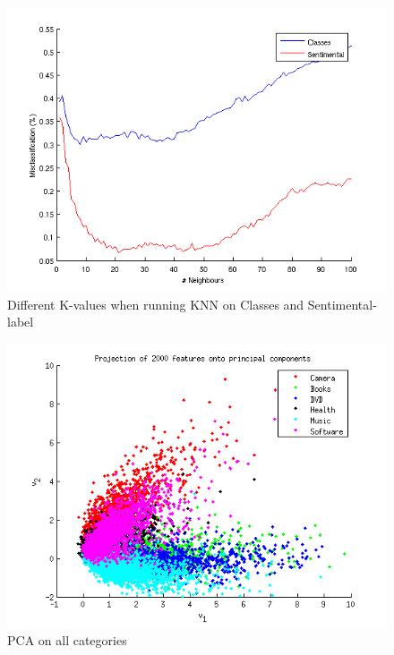 \begin{figure}[H]
\centering
\includegraphics[scale = 0.5]{../Plottar/knn_2000words_testdata100_unigram.png}
\caption{Different K-values when running KNN on Classes and Sentimental-label}
\label{fig:trainingsize}
\end{figure} 


\begin{figure}[H]
\centering
\includegraphics[scale = 0.5]{../Plottar/pca_all.png}
\caption{PCA on all categories}
\label{fig:trainingsize}
\end{figure} 

